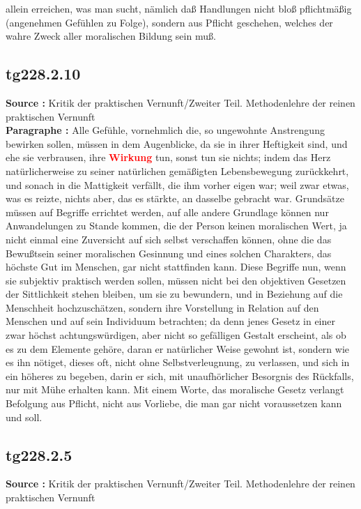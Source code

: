 \documentclass[a4paper,12pt,twoside]{book}
\newcommand{\match}[1]{\textcolor{red}{\textbf{#1}}}
\begin{document}
allein erreichen, was man sucht, nämlich daß Handlungen nicht bloß pflichtmäßig (angenehmen Gefühlen zu Folge), sondern aus Pflicht geschehen, welches der wahre Zweck aller moralischen Bildung sein muß. 
	
	\subsection*{tg228.2.10} 
	\textbf{Source : }Kritik der praktischen Vernunft/Zweiter Teil. Methodenlehre der reinen praktischen Vernunft\\  
	
	\noindent\textbf{Paragraphe : }Alle Gefühle, vornehmlich die, so ungewohnte Anstrengung bewirken sollen, müssen in dem Augenblicke, da sie in ihrer Heftigkeit sind, und ehe sie verbrausen, ihre \match{Wirkung} tun, sonst tun sie nichts; indem das Herz natürlicherweise zu seiner natürlichen gemäßigten Lebensbewegung zurückkehrt, und sonach in die Mattigkeit verfällt, die ihm vorher eigen war; weil zwar etwas, was es reizte, nichts aber, das es stärkte, an dasselbe gebracht war. Grundsätze müssen auf Begriffe errichtet werden, auf alle andere Grundlage können nur Anwandelungen zu Stande kommen, die der Person keinen moralischen Wert, ja nicht einmal eine Zuversicht auf sich selbst verschaffen können, ohne die das Bewußtsein seiner moralischen Gesinnung und eines solchen Charakters, das höchste Gut im Menschen, gar nicht stattfinden  kann. Diese Begriffe nun, wenn sie subjektiv praktisch werden sollen, müssen nicht bei den objektiven Gesetzen der Sittlichkeit stehen bleiben, um sie zu bewundern, und in Beziehung auf die Menschheit hochzuschätzen, sondern ihre Vorstellung in Relation auf den Menschen und auf sein Individuum betrachten; da denn jenes Gesetz in einer zwar höchst achtungswürdigen, aber nicht so gefälligen Gestalt erscheint, als ob es zu dem Elemente gehöre, daran er natürlicher Weise gewohnt ist, sondern wie es ihn nötiget, dieses oft, nicht ohne Selbstverleugnung, zu verlassen, und sich in ein höheres zu begeben, darin er sich, mit unaufhörlicher Besorgnis des Rückfalls, nur mit Mühe erhalten kann. Mit einem Worte, das moralische Gesetz verlangt Befolgung aus Pflicht, nicht aus Vorliebe, die man gar nicht voraussetzen kann und soll. 
	
	\subsection*{tg228.2.5} 
	\textbf{Source : }Kritik der praktischen Vernunft/Zweiter Teil. Methodenlehre der reinen praktischen Vernunft\\  
	
\end{document}
